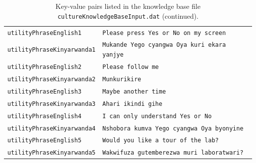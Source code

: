 \documentclass{CSSRforAfrica}
\begin{document}
\begin{table}[H]
\caption{Key-value pairs listed in the knowledge base file  {\tt \small cultureKnowledgeBaseInput.dat} (continued).}
\label{fig:cultureKnowledgeBase2}
\vspace{-3mm}
\begin{tabular}{l l}
{\footnotesize \verb+utilityPhraseEnglish1+} 	                          & {\footnotesize \verb+Please press Yes or No on my screen+} \vspace{-1.5mm}\\
{\footnotesize \verb+utilityPhraseKinyarwanda1+} 	                  & {\footnotesize \verb+Mukande Yego cyangwa Oya kuri ekara yanjye+} \vspace{-1.5mm}\\
{\footnotesize \verb+utilityPhraseEnglish2+} 	                          & {\footnotesize \verb+Please follow me+} \vspace{-1.5mm}\\
{\footnotesize \verb+utilityPhraseKinyarwanda2+} 	                  & {\footnotesize \verb+Munkurikire+} \vspace{-1.5mm}\\
{\footnotesize \verb+utilityPhraseEnglish3+} 	                          & {\footnotesize \verb+Maybe another time+} \vspace{-1.5mm}\\
{\footnotesize \verb+utilityPhraseKinyarwanda3+} 	                  & {\footnotesize \verb+Ahari ikindi gihe+} \vspace{-1.5mm}\\
{\footnotesize \verb+utilityPhraseEnglish4+} 	                          & {\footnotesize \verb+I can only understand Yes or No+} \vspace{-1.5mm}\\
{\footnotesize \verb+utilityPhraseKinyarwanda4+} 	                  & {\footnotesize \verb+Nshobora kumva Yego cyangwa Oya byonyine+} \vspace{-1.5mm}\\
{\footnotesize \verb+utilityPhraseEnglish5+} 	                          & {\footnotesize \verb+Would you like a tour of the lab?+} \vspace{-1.5mm}\\
{\footnotesize \verb+utilityPhraseKinyarwanda5+} 	                  & {\footnotesize \verb+Wakwifuza gutemberezwa muri laboratwari?+} \vspace{-1.5mm}\\

\end{tabular}
\end{table}
\end{document}
